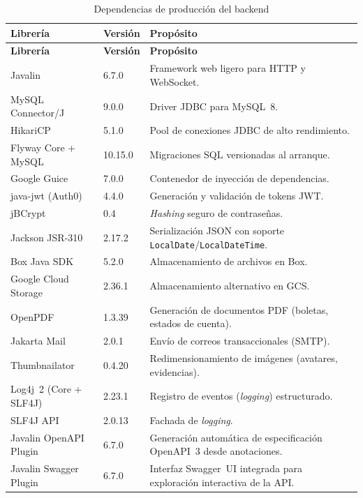 \begin{longtable}{|p{}|p{}|p{}|}
\caption{Dependencias de producción del backend}\label{tab:deps-backend}\\
\hline
\textbf{Librería} & \textbf{Versión} & \textbf{Propósito} \\
\hline
\endfirsthead
\hline
\textbf{Librería} & \textbf{Versión} & \textbf{Propósito} \\
\hline
\endhead
\hline
\endfoot

Javalin & 6.7.0 & Framework web ligero para HTTP y WebSocket. \\
\hline
MySQL Connector/J & 9.0.0 & Driver JDBC para MySQL~8. \\
\hline
HikariCP & 5.1.0 & Pool de conexiones JDBC de alto rendimiento. \\
\hline
Flyway Core + MySQL & 10.15.0 & Migraciones SQL versionadas al arranque. \\
\hline
Google Guice & 7.0.0 & Contenedor de inyección de dependencias. \\
\hline
java-jwt (Auth0) & 4.4.0 & Generación y validación de tokens JWT. \\
\hline
jBCrypt & 0.4 & \textit{Hashing} seguro de contraseñas. \\
\hline
Jackson JSR-310 & 2.17.2 & Serialización JSON con soporte \texttt{LocalDate}/\texttt{LocalDateTime}. \\
\hline
Box Java SDK & 5.2.0 & Almacenamiento de archivos en Box. \\
\hline
Google Cloud Storage & 2.36.1 & Almacenamiento alternativo en GCS. \\
\hline
OpenPDF & 1.3.39 & Generación de documentos PDF (boletas, estados de cuenta). \\
\hline
Jakarta Mail & 2.0.1 & Envío de correos transaccionales (SMTP). \\
\hline
Thumbnailator & 0.4.20 & Redimensionamiento de imágenes (avatares, evidencias). \\
\hline
Log4j~2 (Core + SLF4J) & 2.23.1 & Registro de eventos (\textit{logging}) estructurado. \\
\hline
SLF4J API & 2.0.13 & Fachada de \textit{logging}. \\
\hline
Javalin OpenAPI Plugin & 6.7.0 & Generación automática de especificación OpenAPI~3 desde anotaciones. \\
\hline
Javalin Swagger Plugin & 6.7.0 & Interfaz Swagger~UI integrada para exploración interactiva de la API. \\

\end{longtable}

